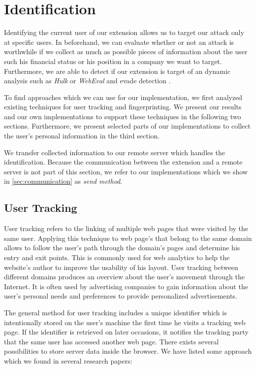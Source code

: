 \newpage	
\section{Identification}
\label{sec:identification}

	Identifying the current user of our extension allows us to target our attack only at specific users. In beforehand, we can evaluate whether or not an attack is worthwhile if we collect as much as possible pieces of information about the user such his financial status or his position in a company we want to target. Furthermore, we are able to detect if our extension is target of an dynamic analysis such as \textit{Hulk} or \textit{WebEval} and evade detection \cite{184485,190984}.
	
	To find approaches which we can use for our implementation, we first analyzed existing techniques for user tracking and fingerprinting. We present our results and our own implementations to support these techniques in the following two sections. Furthermore, we present selected parts of our implementations to collect the user's personal information in the third section.
	
	We transfer collected information to our remote server which handles the identification. Because the communication between the extension and a remote server is not part of this section, we refer to our implementations which we show in \autoref{sec:communication} as \textit{send method}.
	
\subsection{User Tracking}

	User tracking refers to the linking of multiple web pages that were visited by the same user. Applying this technique to web page's that belong to the same domain allows to follow the user's path through the domain's pages and determine his entry and exit points. This is commonly used for web analytics to help the website's author to improve the usability of his layout. User tracking between different domains produces an overview about the user's movement through the Internet. It is often used by advertising companies to gain information about the user's personal needs and preferences to provide personalized advertisements. 
		
	The general method for user tracking includes a unique identifier which is intentionally stored on the user's machine the first time he visits a tracking web page. If the identifier is retrieved on later occasions, it notifies the tracking party that the same user has accessed another web page. There exists several possibilities to store server data inside the browser. We have listed some approach which we found in several research papers:
	
